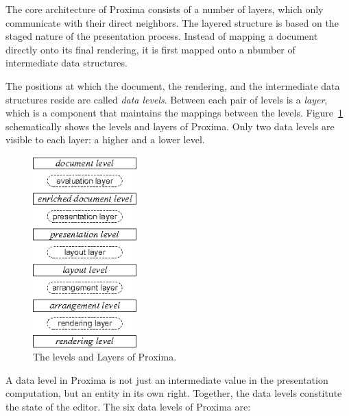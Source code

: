 \documentclass[12pt]{article}
\begin{document}
The core architecture of Proxima consists of a number of layers, which only communicate with their direct neighbors. The layered structure is based on the staged nature of the presentation process. Instead of mapping a document directly onto its final rendering, it is first mapped onto a nbumber of intermediate data structures.

The positions at which the document, the rendering, and the intermediate data structures reside are called {\em data levels}. Between each pair of levels is a {\em layer}, which is a component that maintains the mappings between the levels. Figure~\ref{fig:levelsAndLayers} schematically shows the levels and layers of Proxima. Only two data levels are visible to each layer: a higher and a lower level.

\begin{figure}[ht]
\centering
\includegraphics[width=4cm]{images/LevelLayerNames}
\caption{The levels and Layers of Proxima.}
\label{fig:levelsAndLayers}
\end{figure}

A data level in Proxima is not just an intermediate value in the presentation computation, but an entity in its own right. Together, the data levels constitute the state of the editor. The six data levels of Proxima are:
\end{document}
